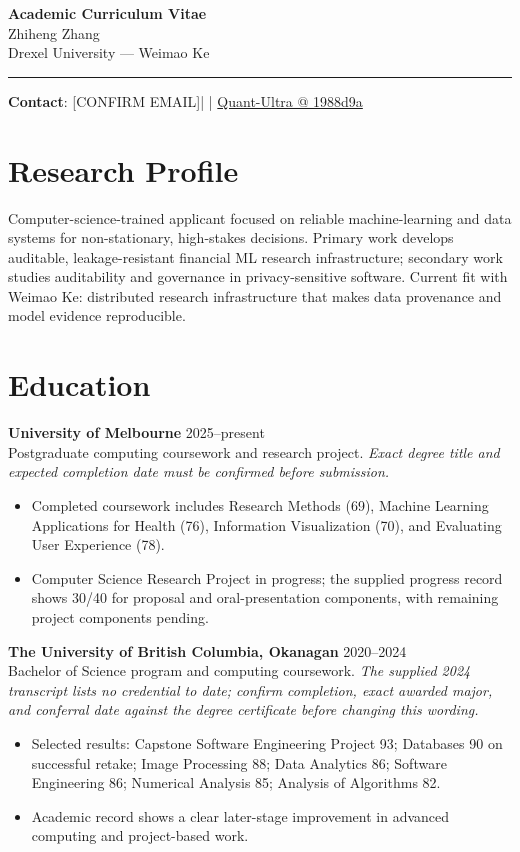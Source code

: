 \documentclass[11pt]{article}
\makeatletter
\newcommand{\ApplicantName}{Zhiheng Zhang}
\newcommand{\ApplicantEmail}{[CONFIRM EMAIL]}
\newcommand{\ApplicantPhone}{[CONFIRM PHONE]}
\newcommand{\ApplicantGitHub}{\href{https://github.com/zhiheng-zhang-Mera/Quant-Ultra/tree/1988d9a8530da91a8158de864d098ea869098923}{Quant-Ultra @ 1988d9a}}
\makeatother
\begin{document}
\begin{center}
{\LARGE\bfseries Academic Curriculum Vitae}\\[0.25em]
{\large \ApplicantName}\\
Drexel University --- Weimao Ke
\end{center}
\vspace{0.35em}\hrule\vspace{0.65em}

\textbf{Contact}: \ApplicantEmail\quad | \quad \ApplicantPhone\quad | \quad \ApplicantGitHub

\section*{Research Profile}
Computer-science-trained applicant focused on reliable machine-learning and data systems for non-stationary, high-stakes decisions. Primary work develops auditable, leakage-resistant financial ML research infrastructure; secondary work studies auditability and governance in privacy-sensitive software. Current fit with Weimao Ke: distributed research infrastructure that makes data provenance and model evidence reproducible.

\section*{Education}
\textbf{University of Melbourne} \hfill 2025--present\\
Postgraduate computing coursework and research project. \textit{Exact degree title and expected completion date must be confirmed before submission.}
\begin{itemize}
\item Completed coursework includes Research Methods (69), Machine Learning Applications for Health (76), Information Visualization (70), and Evaluating User Experience (78).
\item Computer Science Research Project in progress; the supplied progress record shows 30/40 for proposal and oral-presentation components, with remaining project components pending.
\end{itemize}

\textbf{The University of British Columbia, Okanagan} \hfill 2020--2024\\
Bachelor of Science program and computing coursework. \textit{The supplied 2024 transcript lists no credential to date; confirm completion, exact awarded major, and conferral date against the degree certificate before changing this wording.}
\begin{itemize}
\item Selected results: Capstone Software Engineering Project 93; Databases 90 on successful retake; Image Processing 88; Data Analytics 86; Software Engineering 86; Numerical Analysis 85; Analysis of Algorithms 82.
\item Academic record shows a clear later-stage improvement in advanced computing and project-based work.
\end{itemize}
\end{document}
